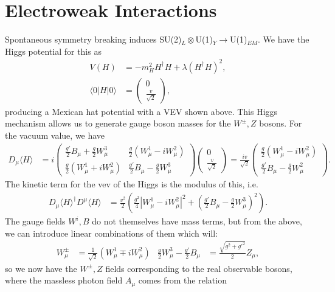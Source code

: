 \documentclass[a4paper, 11pt, normalem]{report}
\begin{document}
\chapter{Electroweak Interactions}
Spontaneous symmetry breaking induces SU(2)$_L\otimes$U(1)$_Y\to$U(1)$_{EM}$.
We have the Higgs potential for this as
\begin{align}
    V(H) &= -m_H^2H^\dagger H + \lambda(H^\dagger H)^2, \\
    \langle0|H|0\rangle &= \begin{pmatrix} 0 \\ \frac{v}{\sqrt{2}}\end{pmatrix},
\end{align}
producing a Mexican hat potential with a VEV shown above.
This Higgs mechanism allows us to generate gauge boson masses for the $W^\pm,Z$ bosons.
For the vacuum value, we have
\begin{align}
    D_\mu\langle H\rangle &= i\begin{pmatrix} \frac{g'}{2}B_\mu + \frac{g}{2}W_\mu^3 & \frac{g}{2}\left(W^1_\mu - iW_\mu^2\right) \\ \frac{g}{2}\left(W_\mu^1+iW_\mu^2\right) & \frac{g'}{2}B_\mu - \frac{g}{2}W_\mu^3\end{pmatrix} \begin{pmatrix} 0 \\ \frac{v}{\sqrt{2}} \end{pmatrix} = \frac{iv}{\sqrt{2}}\begin{pmatrix} \frac{g}{2}(W_\mu^1-iW_\mu^2) \\ \frac{g'}{2}B_\mu - \frac{g}{2}W_\mu^2\end{pmatrix}.
\end{align}
The kinetic term for the vev of the Higgs is the modulus of this, i.e.
\begin{align}
    D_\mu\langle H\rangle^\dagger D^\mu\langle H\rangle &= \frac{v^2}{2}\left(\frac{g^2}{4}|W_\mu^1-iW_\mu^2|^2 + \left(\frac{g'}{2}B_\mu - \frac{g}{2}W_\mu^3\right)^2\right).
\end{align}
The gauge fields $W^i,B$ do not themselves have mass terms, but from the above, we can introduce linear combinations of them which will:
\begin{align}
    W_\mu^\pm &= \frac{1}{\sqrt{2}}\left(W_\mu^1\mp iW_\mu^2\right) & \frac{g}{2}W_\mu^3 - \frac{g'}{2}B_\mu &= \frac{\sqrt{g^2+g'^2}}{2}Z_\mu,
\end{align}
so we now have the $W^\pm,Z$ fields corresponding to the real observable bosons, where the massless photon field $A_\mu$ comes from the relation
\end{document}

